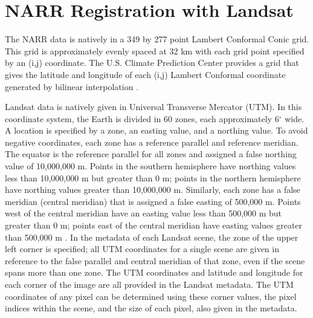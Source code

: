 \documentclass{book}
\begin{document}
\section{NARR Registration with Landsat}
\label{sec:narrregistrationwithlandsat}

The NARR data is natively in a 349 by 277 point Lambert Conformal Conic grid.  This grid is approximately evenly spaced at 32 km with each grid point specified by an (i,j) coordinate.  The U.S. Climate Prediction Center provides a grid that gives the latitude and longitude of each (i,j) Lambert Conformal coordinate generated by bilinear interpolation \cite{narr_data}.

Landsat data is natively given in Universal Transverse Mercator (UTM).  In this coordinate system, the Earth is divided in 60 zones, each approximately 6$^\circ$ wide.  A location is specified by a zone, an easting value, and a northing value.  To avoid negative coordinates, each zone has a reference parallel and reference meridian.  The equator is the reference parallel for all zones and assigned a false northing value of 10,000,000 m.  Points in the southern hemisphere have northing values less than 10,000,000 m but greater than 0 m; points in the northern hemisphere have northing values greater than 10,000,000 m.  Similarly, each zone has a false meridian (central meridian) that is assigned a false easting of 500,000 m.  Points west of the central meridian have an easting value less than 500,000 m but greater than 0 m; points east of the central meridian have easting values greater than 500,000 m \cite{utm}.  In the metadata of each Landsat scene, the zone of the upper left corner is specified; all UTM coordinates for a single scene are given in reference to the false parallel and central meridian of that zone, even if the scene spans more than one zone.  The UTM coordinates and latitude and longitude for each corner of the image are all provided in the Landsat metadata.  The UTM coordinates of any pixel can be determined using these corner values, the pixel indices within the scene, and the size of each pixel, also given in the metadata.
\end{document}
